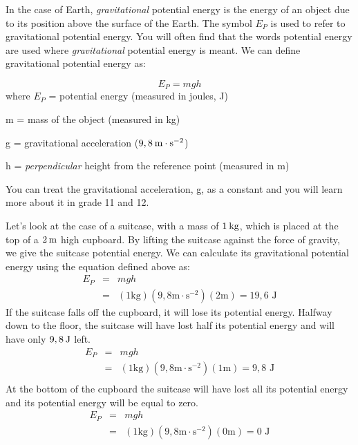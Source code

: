       \label{m38784*id66167}In the case of Earth, \textsl{gravitational} potential energy is the energy of an object due to its position above the surface of the Earth. The symbol ${E}_{P}$ is used to refer to gravitational potential energy. 
You will often find that the words potential energy are used where \textsl{gravitational} potential energy is meant. 
We can define gravitational potential energy as:\par 
      \begin{equation*}
    \boxed{{E}_{P}=mgh}
      \end{equation*}
where
${E}_{P}$ = potential energy (measured in joules, J)\par 
      \label{m38784*id66229}m = mass of the object (measured in kg)\par 
      \label{m38784*id66234}g = gravitational acceleration ($9,8\phantom{\rule{2pt}{0ex}}\text{m}\ensuremath{\cdot}\text{s}{}^{-2}$)\par 
      \label{m38784*id66266}h = \textit{perpendicular} height from the reference point (measured in m)\par 
      \label{m38784*eip-306}

You can treat the gravitational acceleration, g, as a constant and you will learn more about it in grade 11 and 12. 

Let's look at the case of a 
suitcase, with a mass of $1\phantom{\rule{2pt}{0ex}}\text{kg}$, which is placed at the top of a $2\phantom{\rule{2pt}{0ex}}\text{m}$ high cupboard. By lifting the suitcase against the force of gravity, we give the suitcase potential energy. We can calculate its gravitational potential energy using the equation defined above as:
\begin{eqnarray*}
E_{P} & = & mgh \\
& = & (1\text{kg})(9,8\text{m}\ensuremath{\cdot}\text{s}{}^{-2})(2\text{m}) = 19,6 \text{ J}
\end{eqnarray*}
If the suitcase falls off the cupboard, it will lose its potential energy. Halfway down to the floor, the suitcase will have lost half its potential energy and will have only $9,8\phantom{\rule{2pt}{0ex}}\text{J}$ left. 
\begin{eqnarray*}
E_{P} & = & mgh \\
& = & (1\text{kg})(9,8\text{m}\ensuremath{\cdot}\text{s}{}^{-2})(1\text{m}) = 9,8 \text{ J} \\
\end{eqnarray*}
At the bottom of the cupboard the suitcase will have lost all its potential energy and its potential energy will be equal to zero.
\begin{eqnarray*}
E_{P} & = & mgh \\
& = & (1\text{kg})(9,8\text{m}\ensuremath{\cdot}\text{s}{}^{-2})(0\text{m}) = 0 \text{ J} \\
\end{eqnarray*}

